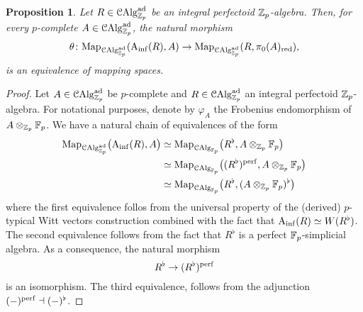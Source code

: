 \documentclass[10pt,a4paper]{amsart}
\numberwithin{equation}{subsection}
\newtheorem{proposition}[theorem]{Proposition}
\theoremstyle{definition}
\begin{document}
\begin{proposition} \label{prop:Ainf_de_Rham}
    Let $R \in \mathcal C \mathrm{Alg}^{\mathrm{ad}}_{\mathbb Z_p}$ be an integral perfectoid $\mathbb Z_p$-algebra. Then, for every $p$-complete $A \in \mathcal C \mathrm{Alg}^{\mathrm{ad}}_{\mathbb Z_p}$, the natural morphism
        \[
               \theta \colon \mathrm{Map}_{\mathcal C \mathrm{Alg}^{\mathrm{ad}}_{\mathbb Z_p}}(\mathrm{A}_{\mathrm{inf}}(R), A) \to   \mathrm{Map}_{\mathcal C \mathrm{Alg}^{\mathrm{ad}}_{\mathbb Z_p}}(R, \pi_0(A)_\mathrm{red}) ,
        \]
    is an equivalence of mapping spaces.
\end{proposition}

\begin{proof} Let $A \in \mathcal C \mathrm{Alg}^{\mathrm{ad}}_{\mathbb Z_p}$ be $p$-complete and $R \in \mathcal C \mathrm{Alg}^{\mathrm{ad}}_{\mathbb Z_p}$ an integral perfectoid $\mathbb Z_p$-algebra. For notational purposes, denote by $\varphi_A$ the Frobenius endomorphism of $A \otimes_{\mathbb Z_p} \mathbb F_p$.
    We have a natural chain of equivalences of the form
        \begin{align*}
            \mathrm{Map}_{\mathcal C \mathrm{Alg}^{\mathrm{ad}}_{\mathbb Z_p}} \big( \mathrm{A}_{\mathrm{inf}}(R), A \big) & \simeq \mathrm{Map}_{\mathcal{C}\mathrm{Alg}_{\mathbb F_p}} \big( R^\flat, A \otimes_{\mathbb Z_p} \mathbb F_p \big) \\
                                                   & \simeq \mathrm{Map}_{\mathcal{C}\mathrm{Alg}_{\mathbb F_p}} \big( (R^\flat)^{\mathrm{perf}}, A \otimes_{\mathbb Z_p} \mathbb F_p \big) \\
                                                   & \simeq \mathrm{Map}_{\mathcal{C}\mathrm{Alg}_{\mathbb F_p}} \big( R^\flat, (A \otimes_{\mathbb Z_p} \mathbb F_p)^\flat \big)
        \end{align*}
    where the first equivalence follos from the universal property of the (derived) $p$-typical Witt vectors construction combined with the fact that $\mathrm{A}_{\mathrm{inf}}(R) \simeq W(R^\flat)$. The second equivalence follows from the fact that $R^\flat$ is a perfect $\mathbb F_p$-simplicial algebra. As a consequence, the natural morphism
        \[
           R^\flat \to ( R^\flat )^{\mathrm{perf}} 
        \]
    is an isomorphism. The third equivalence, follows from the adjunction $(-)^{\mathrm{perf}} \dashv (-)^\flat$.


\end{proof}
\end{document}
